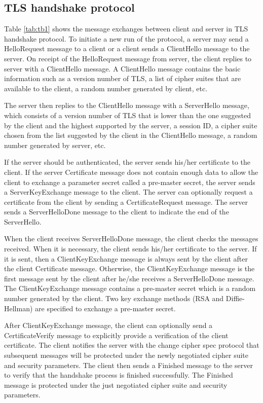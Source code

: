 \documentclass[a4paper,fleqn]{cas-dc}
\begin{document}
\subsection{TLS handshake protocol}\label{handshake}
Table \ref{tab:tb1} shows the message exchanges between client and server in TLS handshake protocol. 
To initiate a new run of the protocol, a server may send a HelloRequest message to a client or a client sends a ClientHello message to the server. On receipt of the HelloRequest message from server, the client replies to server with a ClientHello message. A ClientHello message contains the basic information such as a version number of TLS, a list of cipher suites that are available to the client, a random number generated by client, etc.

The server then replies to the ClientHello message with a
ServerHello message, which consists of a version number of TLS that is lower than the one suggested by the client and the highest supported by the server, a session ID, a cipher suite chosen from the list suggested by the client in the ClientHello message, a random number generated by server, etc. 

If the server should be authenticated, the server sends  his/her certificate to the client. If the server Certificate message does not contain enough data to allow the client to exchange a parameter secret called a pre-master secret, the server sends a ServerKeyExchange message to the client. The server can optionally request a certificate from the client by sending a CertificateRequest message. The server sends a ServerHelloDone message to the client to indicate the end of the ServerHello.

When the client receives ServerHelloDone message, the client checks the messages received. When it is necessary, the client sends his/her certificate to the server. If it is sent, then a ClientKeyExchange message is always sent by the client after the client Certificate message. Otherwise, the ClientKeyExchange message is the first message sent by the client after he/she receives a ServerHelloDone message. The ClientKeyExchange message
contains a pre-master secret which is a random number generated by the client. Two key exchange methods (RSA and Diffie-Hellman) are specified to exchange a pre-master secret. 

After ClientKeyExchange message, the client can optionally send a CertificateVerify message to explicitly provide a verification of the client certificate.
The client notifies the server with the change cipher spec protocol that subsequent messages will be protected under the newly negotiated cipher suite and security parameters. The client then sends a Finished message to the server to verify that the handshake process
is finished successfully. The Finished message is protected under the just negotiated cipher suite and security parameters.
\end{document}
